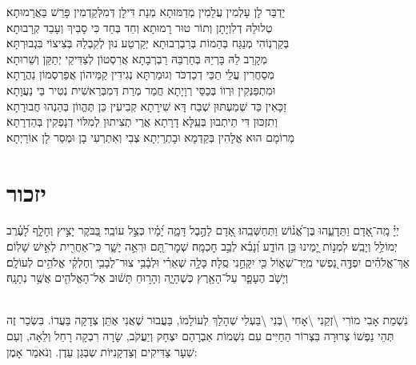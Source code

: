 \documentclass[twoside, openany, parskip=half, 11pt]{book}
\begin{document}
\begin{footnotesize}
\shatz
יַדְבַּר לָן עָלְמִין עֲלֵמִין מְדַמּוּתָא מְנָת דִּילָן דְּמִלְּקַדְמִין פָּרֵשׁ בַּאֲרָמוּתָא׃\\
\kahal
טְלוּלֵהּ דְלִוְיָתָן וְתוֹר טוּר רָמוּתָא וְחַד בְּחַד כִּי סָבִיךְ וְעָבֵד קְרָבוּתָא׃\\
\shatz
בְּקַרְנֽוֹהִי מְנַגַּח בְּהֵמוֹת בְּרַבְרְבוּתָא יְקַרְטַע נוּן לְקִבְלֵהּ בְּצִיצוֹי בִּגְבוּרְתָּא׃\\
\kahal
מְקָרֵב לֵהּ בָּרְיֵהּ בְּחַרְבֵּהּ רַבְרְבָתָא אֲרִסְטוֹן לְצַדִּיקֵי יְתַקֵּן וְשֵׁרוּתָא׃\\
\shatz
מְסַחֲרִין עֲלֵי תַכֵּי דְכַדְכֹּד וְגוּמַרְתָּא נְגִידִין קַמֵּיהוֹן אֲפַרְסְמוֹן נַהֲרָתָא׃\\
\kahal
וּמִתְפַּנְּקִין וּרְווֹ בְּכַסֵּי רְוָיָתָא חֲמַר מְרַת דְּמִבְּרֵאשִׁית נְטִיר בֵּי נַעֲוָתָא׃\\
\shatz
זַכָּאִין כַּד שְׁמַעְתּוּן שְׁבַח דָּא שִׁירָתָא קְבִיעִין כֵּן תֶּהֱווֹן בְּהַנְהוּ חֲבוּרָתָא׃\\
\kahal
וְתִזְכּוּן דִּי תֵיתְבוּן בְּעֵֽלָּא דָרָתָא אֲרֵי תְצִיתוּן לְמִלּוֹי דְנָפְקִין בְּהַדְרָתָא׃\\
\shatz
מְרוֹמָם הוּא אֱלָהִין בְּקַדְמָא וּבָתְרַיְתָא צְבִי וְאִתְרְעִי בָן וּמְסַר לָן אוֹרַיְתָא׃\\ 
\end{footnotesize}

\section[יזכור]{ יזכור }


יְיָ֗ מָֽה־אָ֭דָם וַתֵּדָעֵ֑הוּ בֶּן־אֱ֝נ֗וֹשׁ וַתְּחַשְּׁבֵֽהוּ׃ אָ֭דָם לַהֶ֣בֶל דָּמָ֑ה יָ֝מָ֗יו כְּצֵ֣ל עוֹבֵֽר׃
בַּ֭בֹּקֶר יָצִ֣יץ וְחָלָ֑ף לָ֝עֶ֗רֶב יְמוֹלֵ֥ל וְיָבֵֽשׁ׃ לִמְנ֣וֹת יָ֭מֵינוּ כֵּ֣ן הוֹדַ֑ע וְ֝נָבִ֗א לְבַ֣ב חׇכְמָֽה׃
שְׁמׇר־תָּ֭ם וּרְאֵ֣ה יָשָׁ֑ר כִּֽי־אַחֲרִ֖ית לְאִ֣ישׁ שָׁלֽוֹם׃
אַךְ־אֱלֹהִ֗ים יִפְדֶּ֣ה נַ֭פְשִׁי מִֽיַּד־שְׁא֑וֹל כִּ֖י יִקָּחֵ֣נִי סֶֽלָה׃ 
כָּלָ֥ה שְׁאֵרִ֗י וּלְבָ֫בִ֥י צוּר־לְבָבִ֥י וְחֶלְקִ֗י אֱלֹהִ֥ים לְעוֹלָֽם׃ 
וְיָשֹׁ֧ב הֶעָפָ֛ר עַל־הָאָ֖רֶץ כְּשֶׁהָיָ֑ה וְהָר֣וּחַ תָּשׁ֔וּב אֶל־הָאֱלֹהִ֖ים אֲשֶׁ֥ר נְתָנָֽהּ׃

\\
נִשְׁמַת אָבִי מוֹרִי \textbackslash זְקֵנִי \textbackslash אָחִי \textbackslash בְּנִי \textbackslash בַּעְלִי  שְׁהָלַךְ לְעוֹלָמוֹ, בַּעֲבוּר שֶׁאֲנִי אֶתֵּן צְדָקָה בַּעֲדוֹ. בִּשְׂכַר זֶה תְּהֵי נַפְשׁוֹ צְרוּרָה בִּצְרוֹר הַחַיִּים עִם נִשְׁמוֹת אַבְרָהַם יִצְחָק וְיַעֲקֹב, שָׂרָה רִבְקָה רָחֵל וְלֵאָה, וְעִם שְׁעָר צַדִּיקִים וְצַדְקָנִיּוֹת שְבְּגַן עֵדֶן. וְנֹאמַר אָמֶן:
\end{document}
